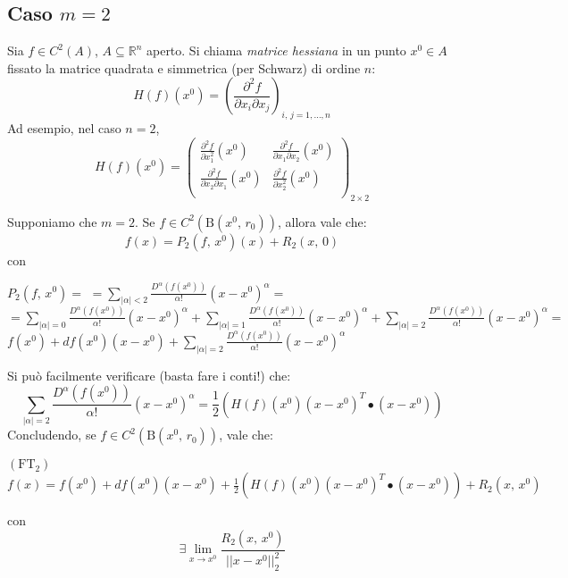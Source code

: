 \subsection{Caso $m=2$}

\begin{definition}
Sia $f \in C^2(A)$, $A \subseteq \mathbb{R}^n$ aperto. Si chiama \emph{matrice hessiana} in un punto $x^0 \in A$ fissato la matrice quadrata e simmetrica (per Schwarz) di ordine $n$:
$$
H(f)(x^0) = \left( \frac{\partial^2f}{\partial x_i \partial x_j} \right)_{i,\,j = 1,\ldots,n}
$$
Ad esempio, nel caso $n = 2$,
$$
H(f)(x^0) = \left(
\begin{array}{cc}
\displaystyle \frac{\partial^2f}{\partial x_1^2} (x^0) & \displaystyle \frac{\partial^2f}{\partial x_1 \partial x_2} (x^0)\\
\displaystyle \frac{\partial^2f}{\partial x_2 \partial x_1} (x^0) & \displaystyle \frac{\partial^2f}{\partial x_2^2} (x^0)\\
\end{array}
\right)_{2 \times 2}
$$
\end{definition}

\begin{obs}[importante]
Supponiamo che $m=2$. Se $f \in C^2(\mathrm{B}(x^0,\,r_0))$, allora vale che:
$$f(x) = P_2(f,\,x^0)(x) + R_2(x,\,0)$$
con
\begin{flushleft}
$\displaystyle P_2(f,\,x^0) = $
$\displaystyle = \sum_{|\alpha| < 2} \frac{D^{\alpha}(f(x^0))}{\alpha!}(x-x^0)^{\alpha}=$
$\displaystyle = \sum_{|\alpha| = 0} \frac{D^{\alpha}(f(x^0))}{\alpha!}(x-x^0)^{\alpha} +
\sum_{|\alpha| = 1} \frac{D^{\alpha}(f(x^0))}{\alpha!}(x-x^0)^{\alpha}+
\sum_{|\alpha| = 2} \frac{D^{\alpha}(f(x^0))}{\alpha!}(x-x^0)^{\alpha} = $
$f(x^0) + df(x^0)(x-x^0) + \sum_{|\alpha| = 2} \frac{D^{\alpha}(f(x^0))}{\alpha!}(x-x^0)^{\alpha}$
\end{flushleft}
Si può facilmente verificare (basta fare i conti!) che:
$$\sum_{|\alpha| = 2} \frac{D^{\alpha}(f(x^0))}{\alpha!}(x-x^0)^{\alpha} = 
\frac{1}{2} \left( H(f)(x^0)(x-x^0)^T \bullet (x-x^0) \right)$$
Concludendo, se $f \in C^2(\mathrm{B}(x^0,\,r_0))$, vale che:
\begin{center}
$\mathrm{(FT_2)}$
\hfill
$\displaystyle f(x) = f(x^0)+df(x^0)(x-x^0)+\frac{1}{2} \left( H(f)(x^0)(x-x^0)^T \bullet (x-x^0) \right)
+ R_2(x,\,x^0)$
\hfill \null \\
\end{center}
con
$$
\exists \lim_{x \rightarrow x^0} \frac{R_2(x,\,x^0)}{||x-x^0||_2^2}
$$
\end{obs}











